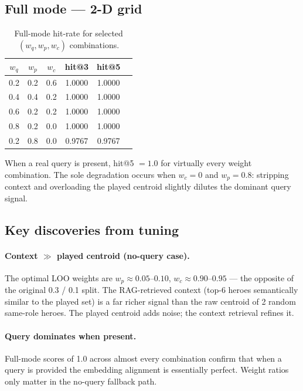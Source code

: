 \documentclass[11pt, a4paper]{article}
\begin{document}
\subsection{Full mode — 2-D grid}

\begin{table}[h]
\centering
\caption{Full-mode hit-rate for selected $(w_q, w_p, w_c)$ combinations.}
\begin{tabular}{cccccc}
\toprule
$w_q$ & $w_p$ & $w_c$ & hit@3 & hit@5 \\
\midrule
0.2 & 0.2 & 0.6 & 1.0000 & 1.0000 \\
0.4 & 0.4 & 0.2 & 1.0000 & 1.0000 \\
0.6 & 0.2 & 0.2 & 1.0000 & 1.0000 \\
0.8 & 0.2 & 0.0 & 1.0000 & 1.0000 \\
0.2 & 0.8 & 0.0 & \textcolor{bad}{0.9767} & \textcolor{bad}{0.9767} \\
\bottomrule
\end{tabular}
\end{table}

\noindent
When a real query is present, hit@5 $= 1.0$ for virtually every weight
combination.  The sole degradation occurs when $w_c = 0$ and $w_p = 0.8$:
stripping context and overloading the played centroid slightly dilutes the
dominant query signal.

\subsection{Key discoveries from tuning}

\paragraph{Context $\gg$ played centroid (no-query case).}
The optimal LOO weights are $w_p \approx 0.05$--$0.10$,
$w_c \approx 0.90$--$0.95$ — the opposite of the original 0.3 / 0.1 split.
The RAG-retrieved context (top-6 heroes semantically similar to the played
set) is a far richer signal than the raw centroid of 2 random same-role
heroes.  The played centroid adds noise; the context retrieval refines it.

\paragraph{Query dominates when present.}
Full-mode scores of 1.0 across almost every combination confirm that when
a query is provided the embedding alignment is essentially perfect.  Weight
ratios only matter in the no-query fallback path.
\end{document}
